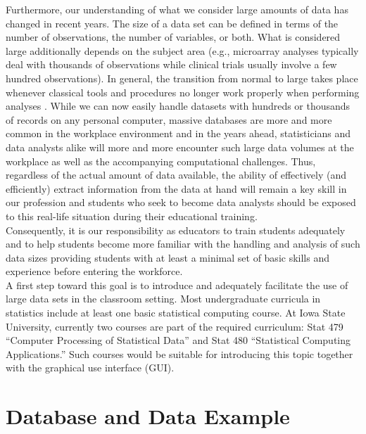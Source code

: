\documentclass[11pt]{tise_style}
\begin{document}
Furthermore, our understanding of what we consider large amounts of data has changed in recent years. The size of a data set can be defined in terms of the number of observations, the number of variables, or both. What is considered large additionally depends on the subject area (e.g., microarray analyses typically deal with thousands of observations while clinical trials usually involve a few hundred observations). In general, the transition from normal to large takes place whenever classical tools and procedures no longer work properly when performing analyses \citep{theus:2008}. 
While we can now easily handle datasets with hundreds or thousands of records on any personal computer,  massive databases are more and more common  in the workplace environment and in the years ahead,  statisticians and data analysts alike will more and more encounter such large data volumes  at the workplace as well as the accompanying computational challenges.  Thus, regardless of the actual amount of data available, the ability of effectively (and efficiently) extract information from the data at hand will remain a key skill in our profession and students who seek to become data analysts should be exposed to this real-life situation during their educational training.\\
Consequently, it is our responsibility as educators to train students adequately and to help students  become more familiar with the handling and analysis of such data sizes providing students with at least a minimal set of basic skills and experience before entering the workforce. \\
A first step toward this goal is to introduce and adequately facilitate the use of large data sets  in the classroom setting. Most undergraduate curricula in statistics include at least one basic statistical computing course. At Iowa State University, currently two courses are part of the required curriculum: Stat 479 ``Computer Processing of Statistical Data'' and Stat 480 ``Statistical Computing Applications.''  Such courses would be suitable for introducing this topic together with the graphical use interface (GUI).  



\section{Database and Data Example}
\end{document}
